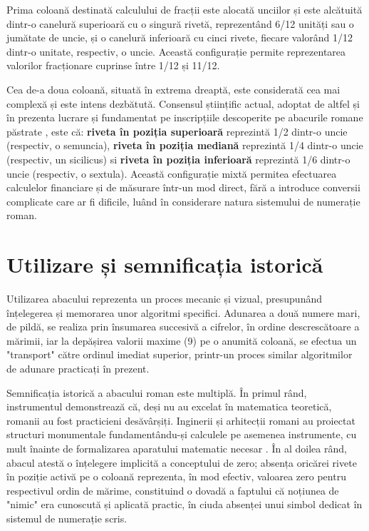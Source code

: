 \documentclass[12pt, a4paper]{article}
\begin{document}
Prima coloană destinată calculului de fracții este alocată unciilor și este alcătuită dintr-o canelură superioară cu o singură rivetă, reprezentând 6/12 unități sau o jumătate de uncie, și o canelură inferioară cu cinci rivete, fiecare valorând 1/12 dintr-o unitate, respectiv, o uncie. Această configurație permite reprezentarea valorilor fracționare cuprinse între 1/12 și 11/12.

Cea de-a doua coloană, situată în extrema dreaptă, este considerată cea mai complexă și este intens dezbătută. Consensul științific actual, adoptat de altfel și în prezenta lucrare și fundamentat pe inscripțiile descoperite pe abacurile romane păstrate \cite{wikipedia}, este că: \textbf{riveta în poziția superioară} reprezintă 1/2 dintr-o uncie (respectiv, o semuncia), \textbf{riveta în poziția mediană} reprezintă 1/4 dintr-o uncie (respectiv, un sicilicus) si \textbf{riveta în poziția inferioară} reprezintă 1/6 dintr-o uncie (respectiv, o sextula). Această configurație mixtă permitea efectuarea calculelor financiare și de măsurare într-un mod direct, fără a introduce conversii complicate care ar fi dificile, luând în considerare natura sistemului de numerație roman.

\section*{Utilizare și semnificația istorică}
\quad Utilizarea abacului reprezenta un proces mecanic și vizual, presupunând înțelegerea și memorarea unor algoritmi specifici. Adunarea a două numere mari, de pildă, se realiza prin însumarea succesivă a cifrelor, în ordine descrescătoare a mărimii, iar la depășirea valorii maxime (9) pe o anumită coloană, se efectua un "transport" către ordinul imediat superior, printr-un proces similar algoritmilor de adunare practicați în prezent.

Semnificația istorică a abacului roman este multiplă. În primul rând, instrumentul demonstrează că, deși nu au excelat în matematica teoretică, romanii au fost practicieni desăvârșiți. Inginerii și arhitecții romani au proiectat structuri monumentale fundamentându-și calculele pe asemenea instrumente, cu mult înainte de formalizarea aparatului matematic necesar \cite{ethw}. În al doilea rând, abacul atestă o înțelegere implicită a conceptului de zero; absența oricărei rivete în poziție activă pe o coloană reprezenta, în mod efectiv, valoarea zero pentru respectivul ordin de mărime, constituind o dovadă a faptului că noțiunea de "nimic" era cunoscută și aplicată practic, în ciuda absenței unui simbol dedicat în sistemul de numerație scris.
\end{document}

